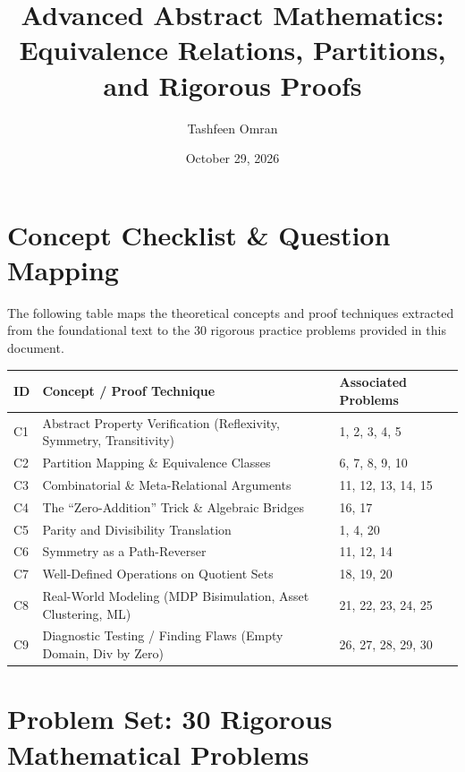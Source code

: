 \documentclass[11pt, a4paper]{article}
\title{Advanced Abstract Mathematics: Equivalence Relations, Partitions, and Rigorous Proofs}
\author{Tashfeen Omran}
\date{October 29, 2026}
\theoremstyle{definition}
\theoremstyle{remark}
\begin{document}
\maketitle
\tableofcontents
\newpage

\section{Concept Checklist \& Question Mapping}

The following table maps the theoretical concepts and proof techniques extracted from the foundational text to the 30 rigorous practice problems provided in this document.

\vspace{1em}
\renewcommand{\arraystretch}{1.5}
\noindent
\begin{tabularx}{\textwidth}{l X l}
\toprule
\textbf{ID} & \textbf{Concept / Proof Technique} & \textbf{Associated Problems} \\
\midrule
C1 & Abstract Property Verification (Reflexivity, Symmetry, Transitivity) & 1, 2, 3, 4, 5 \\
C2 & Partition Mapping \& Equivalence Classes & 6, 7, 8, 9, 10 \\
C3 & Combinatorial \& Meta-Relational Arguments & 11, 12, 13, 14, 15 \\
C4 & The ``Zero-Addition'' Trick \& Algebraic Bridges & 16, 17 \\
C5 & Parity and Divisibility Translation & 1, 4, 20 \\
C6 & Symmetry as a Path-Reverser & 11, 12, 14 \\
C7 & Well-Defined Operations on Quotient Sets & 18, 19, 20 \\
C8 & Real-World Modeling (MDP Bisimulation, Asset Clustering, ML) & 21, 22, 23, 24, 25 \\
C9 & Diagnostic Testing / Finding Flaws (Empty Domain, Div by Zero) & 26, 27, 28, 29, 30 \\
\bottomrule
\end{tabularx}
\vspace{1em}

\newpage

\section{Problem Set: 30 Rigorous Mathematical Problems}
\end{document}
